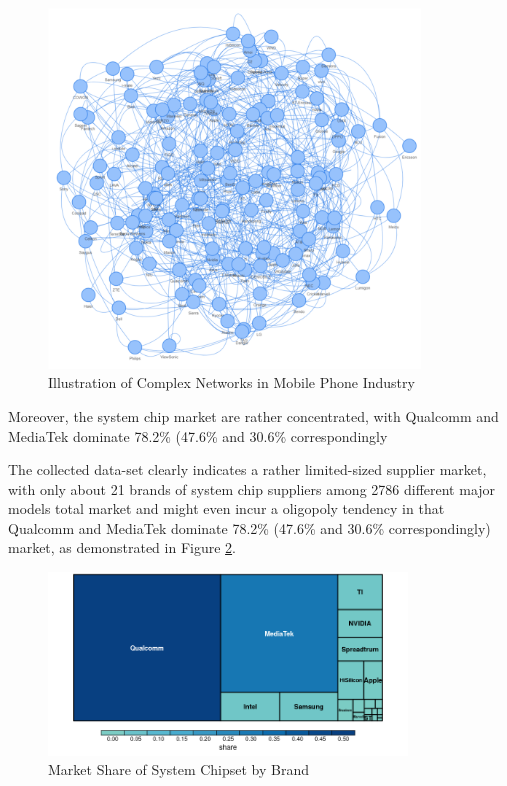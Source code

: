 \documentclass[utf8,english]{gradu3}
\begin{document}
\begin{figure}[htb]
    \centering
    \includegraphics[width=0.88\textwidth]{network.png}
    \caption{Illustration of Complex Networks in Mobile Phone Industry}
    \label{fig:networks}
\end{figure}

Moreover, the system chip market are rather concentrated, with Qualcomm and MediaTek dominate 78.2\% (47.6\% and 30.6\% correspondingly

The collected data-set clearly indicates a rather limited-sized supplier market, with only about 21 brands of system chip suppliers among 2786 different major models total market and might even incur a oligopoly tendency in that Qualcomm and MediaTek dominate 78.2\% (47.6\% and 30.6\% correspondingly) market, as demonstrated in Figure \ref{fig:systemchip}.

\begin{figure}[htb]
    \centering
    \includegraphics[width=0.85\textwidth]{systemchip.png}
    \caption{Market Share of System Chipset by Brand}
    \label{fig:systemchip}
\end{figure}
\end{document}
